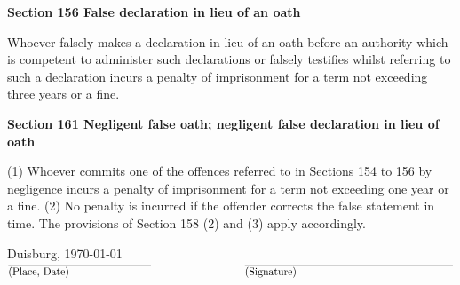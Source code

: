 {\begin{tcolorbox}[colframe=black!100!white,colback=black!0!white,sharp corners]
\footnotesize
\textbf{Section 156 False declaration in lieu of an oath}

Whoever falsely makes a declaration in lieu of an oath
before an authority which is competent to administer such declarations
or falsely testifies whilst referring to such a declaration
incurs a penalty of imprisonment for a term not exceeding three years or a fine.

\tcblower

\footnotesize
\textbf{Section 161 Negligent false oath; negligent false declaration in lieu of oath}

(1) Whoever commits one of the offences referred to in Sections 154 to 156 by negligence
incurs a penalty of imprisonment for a term not exceeding one year or a fine.
(2) No penalty is incurred if the offender corrects the false statement in time.
The provisions of Section 158 (2) and (3) apply accordingly.
\end{tcolorbox}

\vfill
Duisburg, \today\\
$\overline{\parbox{4.8cm}{(Place, Date)}} ~~~~~~~~~~~~~~~~~~~~~~~~~~~ \overline{\parbox{7cm}{(Signature)}}$
}

